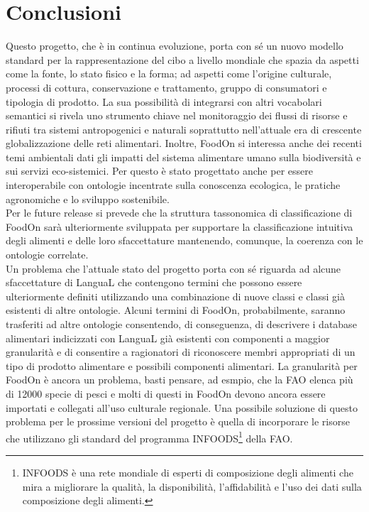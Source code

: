 \chapter{Conclusioni}
Questo progetto, che \`e in continua evoluzione, porta con s\'e un nuovo modello standard per la rappresentazione del cibo a livello mondiale che spazia da aspetti come la fonte, lo stato fisico e la forma; ad aspetti come l'origine culturale, processi di cottura, conservazione e trattamento, gruppo di consumatori e tipologia di prodotto.
La sua possibilit\`a di integrarsi con altri vocabolari semantici si rivela uno strumento chiave nel monitoraggio dei flussi di risorse e rifiuti tra sistemi antropogenici e naturali soprattutto nell'attuale era di crescente globalizzazione delle reti alimentari.
Inoltre, FoodOn si interessa anche dei recenti temi ambientali dati gli impatti del sistema alimentare umano sulla biodiversit\`a e sui servizi eco-sistemici. Per questo \`e stato progettato anche per essere interoperabile con ontologie incentrate sulla conoscenza ecologica, le pratiche agronomiche e lo sviluppo sostenibile.\\
Per le future release si prevede che la struttura tassonomica di classificazione di FoodOn sar\`a ulteriormente sviluppata per supportare la classificazione intuitiva degli alimenti e delle loro sfaccettature mantenendo, comunque, la coerenza con le ontologie correlate.\\
Un problema che l'attuale stato del progetto porta con s\'e riguarda ad alcune sfaccettature di LanguaL che contengono termini che possono essere ulteriormente definiti utilizzando una combinazione di nuove classi e classi gi\`a esistenti di altre ontologie.
Alcuni termini di FoodOn, probabilmente, saranno trasferiti ad altre ontologie consentendo, di conseguenza, di descrivere i database alimentari indicizzati con LanguaL gi\`a esistenti con componenti a maggior granularit\`a e di consentire a ragionatori di riconoscere membri appropriati di un tipo di prodotto alimentare e possibili componenti alimentari.
La granularit\`a per FoodOn \`e ancora un problema, basti pensare, ad esmpio, che la FAO elenca pi\`u di 12000 specie di pesci e molti di questi in FoodOn devono ancora essere importati e collegati all'uso culturale regionale.
Una possibile soluzione di questo problema per le prossime versioni del progetto \`e quella di incorporare le risorse che utilizzano gli standard del programma INFOODS\footnote{INFOODS  \`e una rete mondiale di esperti di composizione degli alimenti che mira a migliorare la qualit\`a, la disponibilit\`a, l'affidabilit\`a e l'uso dei dati sulla composizione degli alimenti.} della FAO.\\
